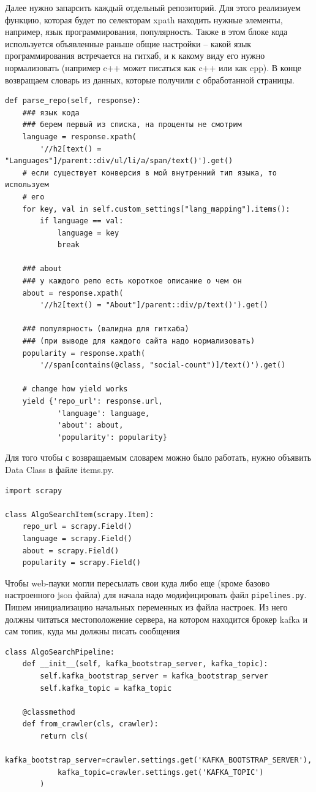 Далее нужно запарсить каждый отдельный репозиторий. Для этого реализиуем
функцию, которая будет по селекторам xpath находить нужные элементы, например,
язык программирования, популярность. Также в этом блоке кода используется
объявленные раньше общие настройки -- какой язык программирования встречается на
гитхаб, и к какому виду его нужно нормализовать (например c++ может писаться как
c++ или как cpp). В конце возвращаем словарь из данных, которые получили с
обработанной страницы.
\begin{verbatim}
def parse_repo(self, response):
    ### язык кода
    ### берем первый из списка, на проценты не смотрим
    language = response.xpath(
        '//h2[text() = "Languages"]/parent::div/ul/li/a/span/text()').get()
    # если существует конверсия в мой внутренний тип языка, то используем
    # его
    for key, val in self.custom_settings["lang_mapping"].items():
        if language == val:
            language = key
            break

    ### about
    ### у каждого репо есть короткое описание о чем он
    about = response.xpath(
        '//h2[text() = "About"]/parent::div/p/text()').get()

    ### популярность (валидна для гитхаба)
    ### (при выводе для каждого сайта надо нормализовать)
    popularity = response.xpath(
        '//span[contains(@class, "social-count")]/text()').get()

    # change how yield works
    yield {'repo_url': response.url,
            'language': language,
            'about': about,
            'popularity': popularity}
\end{verbatim}

Для того чтобы с возвращаемым словарем можно было работать, нужно объявить Data
Class в файле items.py.
\begin{verbatim}
import scrapy

class AlgoSearchItem(scrapy.Item):
    repo_url = scrapy.Field()
    language = scrapy.Field()
    about = scrapy.Field()
    popularity = scrapy.Field()
\end{verbatim}

Чтобы web-пауки могли пересылать свои куда либо еще (кроме базово настроенного
json файла) для начала надо модифицировать файл \verb|pipelines.py|. Пишем
инициализацию начальных переменных из файла настроек. Из него должны читаться
местоположение сервера, на котором находится брокер kafka и сам топик, куда мы
должны писать сообщения
\begin{verbatim}
class AlgoSearchPipeline:
    def __init__(self, kafka_bootstrap_server, kafka_topic):
        self.kafka_bootstrap_server = kafka_bootstrap_server
        self.kafka_topic = kafka_topic

    @classmethod
    def from_crawler(cls, crawler):
        return cls(
            kafka_bootstrap_server=crawler.settings.get('KAFKA_BOOTSTRAP_SERVER'),
            kafka_topic=crawler.settings.get('KAFKA_TOPIC')
        )
\end{verbatim}


